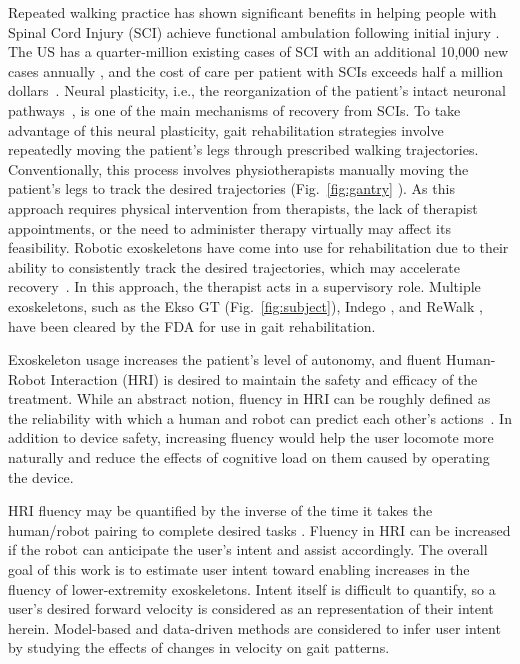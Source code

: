 Repeated walking practice has shown significant benefits in helping people with Spinal Cord Injury (SCI) achieve functional ambulation following initial injury \cite{lam2007systematic}. The US has a quarter-million existing cases of SCI with an additional 10,000 new cases annually \cite{nih}, and the cost of care per patient with SCIs exceeds half a million dollars~\cite{devivo2011costs}. Neural plasticity, i.e., the reorganization of the patient's intact neuronal pathways~\cite{curt2008recovery}, is one of the main mechanisms of recovery from SCIs. To take advantage of this neural plasticity, gait rehabilitation strategies involve repeatedly moving the patient's legs through prescribed walking trajectories. Conventionally, this process involves physiotherapists manually moving the patient's legs to track the desired trajectories (Fig.~\ref{fig:gantry} \cite{gaitrehabgantry}). %
As this approach requires physical intervention from therapists, the lack of therapist appointments, or the need to administer therapy virtually may affect its feasibility. Robotic exoskeletons have come into use for rehabilitation due to their ability to consistently track the desired trajectories, which may accelerate recovery~\cite{hidler2011role}. In this approach, the therapist acts in a supervisory role. Multiple exoskeletons, such as the Ekso GT \cite{brenner2016exploring} (Fig.~\ref{fig:subject}), Indego \cite{sup2008design}, and ReWalk \cite{rewalk}, have been cleared by the FDA for use in gait rehabilitation.

Exoskeleton usage increases the patient's level of autonomy, and fluent Human-Robot Interaction (HRI) is desired to maintain the safety and efficacy of the treatment. While an abstract notion, fluency in HRI can be roughly defined as the reliability with which a human and robot can predict each other's actions~\cite{hoffman2007cost}. In addition to device safety, increasing fluency would help the user locomote more naturally and reduce the effects of cognitive load \cite{bogen2018walk} on them caused by operating the device.

HRI fluency may be quantified by the inverse of the time it takes the human/robot pairing to complete desired tasks \cite{hoffman2019evaluating}. Fluency in HRI can be increased if the robot can anticipate the user's intent and assist accordingly. The overall goal of this work is to estimate user intent toward enabling increases in the fluency of lower-extremity exoskeletons. Intent itself is difficult to quantify, so a user's desired forward velocity is considered as an representation of their intent herein. Model-based and data-driven methods are considered to infer user intent by studying the effects of changes in velocity on gait patterns.

